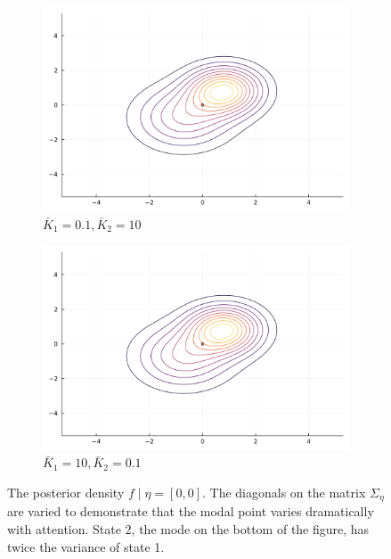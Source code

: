 \documentclass{article}
\begin{document}
\begin{figure}
    \centering
    \begin{subfigure}{0.49\textwidth}
        \centering
        \includegraphics[width=\textwidth]{../plots/posterior/[0.1, 10.0].png}
        \caption{$\bar K_1 = 0.1, \bar K_2 = 10$}
        \label{fig:unimode}
    \end{subfigure}
    \hfill
    \begin{subfigure}{0.49\textwidth}
        \centering
        \includegraphics[width=\textwidth]{../plots/posterior/[10.0, 0.1].png}
        \caption{$\bar K_1 = 10, \bar K_2 = 0.1$}
        \label{fig:bimode}
    \end{subfigure}
    \caption{The posterior density $f \mid \eta=[0,0]$. The diagonals on the matrix $\Sigma_\eta$ are varied to demonstrate that the modal point varies dramatically with attention. State 2, the mode on the bottom of the figure, has twice the variance of state 1.}
    \label{fig:swapped}
\end{figure}
\end{document}
